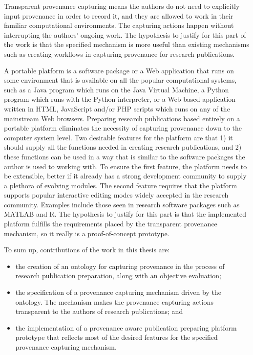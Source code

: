 Transparent provenance capturing means the authors do not need to explicitly input provenance in order to record it, and they are allowed to work in their familiar computational environments. The capturing actions happen without interrupting the authors' ongoing work. The hypothesis to justify for this part of the work is that the specified mechanism is more useful than existing mechanisms such as creating workflows in capturing provenance for research publications.

A portable platform is a software package or a Web application that runs on some environment that is available on all the popular computational systems, such as a Java program which runs on the Java Virtual Machine, a Python program which runs with the Python interpreter, or a Web based application written in HTML, JavaScript and/or PHP scripts which runs on any of the mainstream Web browsers. Preparing research publications based entirely on a portable platform eliminates the necessity of capturing provenance down to the computer system level. Two desirable features for the platform are that 1) it should supply all the functions needed in creating research publications, and 2) these functions can be used in a way that is similar to the software packages the author is used to working with. To ensure the first feature, the platform needs to be extensible, better if it already has a strong development community to supply a plethora of evolving modules. The second feature requires that the platform supports popular interactive editing modes widely accepted in the research community. Examples include those seen in research software packages such as MATLAB and R. The hypothesis to justify for this part is that the implemented platform fulfills the requirements placed by the transparent provenance mechanism, so it really is a proof-of-concept prototype. 

To sum up, contributions of the work in this thesis are:
\begin{itemize}
\item the creation of an ontology for capturing provenance in the process of research publication preparation, along with an objective evaluation;
\item the specification of a provenance capturing mechanism driven by the ontology. The mechanism makes the provenance capturing actions transparent to the authors of research publications; and 
\item the implementation of a provenance aware publication preparing platform prototype that reflects most of the desired features for the specified provenance capturing mechanism.
\end{itemize}

